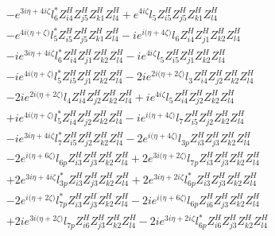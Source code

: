  \begin{align} 
 & - e^{3 i \eta +4 i \zeta } l_6^* Z_{{i 4}}^{H} Z_{{j 5}}^{H} Z_{{k 1}}^{H} Z_{{l 4}}^{H} +e^{4 i \zeta } l_5 Z_{{i 5}}^{H} Z_{{j 5}}^{H} Z_{{k 1}}^{H} Z_{{l 4}}^{H} \nonumber \\ 
 &- e^{4 i \Big(\eta +\zeta \Big)} l_5^* Z_{{i 5}}^{H} Z_{{j 5}}^{H} Z_{{k 1}}^{H} Z_{{l 4}}^{H} -i e^{i \Big(\eta +4 \zeta \Big)} l_6 Z_{{i 4}}^{H} Z_{{j 1}}^{H} Z_{{k 2}}^{H} Z_{{l 4}}^{H} \nonumber \\ 
 &-i e^{3 i \eta +4 i \zeta } l_6^* Z_{{i 4}}^{H} Z_{{j 1}}^{H} Z_{{k 2}}^{H} Z_{{l 4}}^{H} -i e^{4 i \zeta } l_5 Z_{{i 5}}^{H} Z_{{j 1}}^{H} Z_{{k 2}}^{H} Z_{{l 4}}^{H} \nonumber \\ 
 &-i e^{4 i \Big(\eta +\zeta \Big)} l_5^* Z_{{i 5}}^{H} Z_{{j 1}}^{H} Z_{{k 2}}^{H} Z_{{l 4}}^{H} -2 i e^{2 i \Big(\eta +2 \zeta \Big)} l_3 Z_{{i 4}}^{H} Z_{{j 2}}^{H} Z_{{k 2}}^{H} Z_{{l 4}}^{H} \nonumber \\ 
 &-2 i e^{2 i \Big(\eta +2 \zeta \Big)} l_4 Z_{{i 4}}^{H} Z_{{j 2}}^{H} Z_{{k 2}}^{H} Z_{{l 4}}^{H} +i e^{4 i \zeta } l_5 Z_{{i 4}}^{H} Z_{{j 2}}^{H} Z_{{k 2}}^{H} Z_{{l 4}}^{H} \nonumber \\ 
 &+i e^{4 i \Big(\eta +\zeta \Big)} l_5^* Z_{{i 4}}^{H} Z_{{j 2}}^{H} Z_{{k 2}}^{H} Z_{{l 4}}^{H} -i e^{i \Big(\eta +4 \zeta \Big)} l_7 Z_{{i 5}}^{H} Z_{{j 2}}^{H} Z_{{k 2}}^{H} Z_{{l 4}}^{H} \nonumber \\ 
 &-i e^{3 i \eta +4 i \zeta } l_7^* Z_{{i 5}}^{H} Z_{{j 2}}^{H} Z_{{k 2}}^{H} Z_{{l 4}}^{H} -2 e^{i \Big(\eta +4 \zeta \Big)} l_{3p} Z_{{i 3}}^{H} Z_{{j 3}}^{H} Z_{{k 2}}^{H} Z_{{l 4}}^{H} \nonumber \\ 
 &-2 e^{i \Big(\eta +6 \zeta \Big)} l_{6p} Z_{{i 3}}^{H} Z_{{j 3}}^{H} Z_{{k 2}}^{H} Z_{{l 4}}^{H} +2 e^{3 i \Big(\eta +2 \zeta \Big)} l_{7p} Z_{{i 3}}^{H} Z_{{j 3}}^{H} Z_{{k 2}}^{H} Z_{{l 4}}^{H} \nonumber \\ 
 &+2 e^{3 i \eta +4 i \zeta } l_{3p}^* Z_{{i 3}}^{H} Z_{{j 3}}^{H} Z_{{k 2}}^{H} Z_{{l 4}}^{H} +2 e^{3 i \eta +2 i \zeta } l_{6p}^* Z_{{i 3}}^{H} Z_{{j 3}}^{H} Z_{{k 2}}^{H} Z_{{l 4}}^{H} \nonumber \\ 
 &-2 e^{i \Big(\eta +2 \zeta \Big)} l_{7p}^* Z_{{i 3}}^{H} Z_{{j 3}}^{H} Z_{{k 2}}^{H} Z_{{l 4}}^{H} -2 i e^{i \Big(\eta +6 \zeta \Big)} l_{6p} Z_{{i 6}}^{H} Z_{{j 3}}^{H} Z_{{k 2}}^{H} Z_{{l 4}}^{H} \nonumber \\ 
 &+2 i e^{3 i \Big(\eta +2 \zeta \Big)} l_{7p} Z_{{i 6}}^{H} Z_{{j 3}}^{H} Z_{{k 2}}^{H} Z_{{l 4}}^{H} -2 i e^{3 i \eta +2 i \zeta } l_{6p}^* Z_{{i 6}}^{H} Z_{{j 3}}^{H} Z_{{k 2}}^{H} Z_{{l 4}}^{H} \nonumber \\ 

\end{align}
